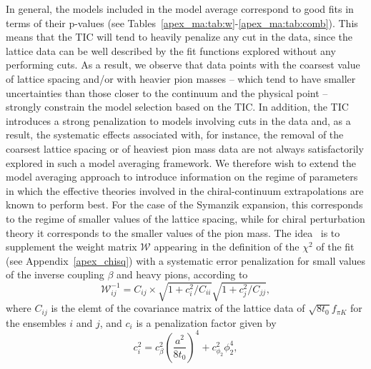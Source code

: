 In general, the models included in the model average correspond to good fits in terms of their p-values (see Tables~\ref{apex_ma:tab:w}-\ref{apex_ma:tab:comb}). This means that the TIC will tend to heavily penalize any cut in the data, since the lattice data can be well described by the fit functions explored without any performing cuts. As a result, we observe that data points with the coarsest value of lattice spacing and/or with heavier pion masses -- which tend to have smaller uncertainties than those closer to the continuum and the physical point -- strongly constrain the model selection based on the TIC. In addition, the TIC introduces a strong  penalization to models involving cuts in the data and, as a result, the systematic effects associated with, for instance, the removal of the coarsest lattice spacing or of heaviest pion mass data are not always satisfactorily explored in such a model averaging framework. We therefore wish to extend the model averaging approach to introduce information on the regime of parameters in which the effective theories involved in the chiral-continuum extrapolations are known to perform best. For the case of the Symanzik expansion, this corresponds to the regime of smaller values of the lattice spacing, while for chiral perturbation theory it corresponds to the smaller values of the pion mass. The idea~\citep{DallaBrida:2016kgh} is to supplement the weight matrix $\mathcal{W}$ appearing in the definition of the $\chi^2$ of the fit (see Appendix~\ref{apex_chisq}) with a systematic error penalization for small values of the inverse coupling $\beta$ and heavy pions, according to 
\begin{equation}
\label{ch_ss:eq:Wpenal}
\mathcal{W}_{ij}^{-1}=C_{ij}\times\sqrt{1+c_i^2/C_{ii}}\sqrt{1+c_j^2/C_{jj}},
\end{equation}
where $C_{ij}$ is the elemt of the covariance matrix of the lattice data of $\sqrt{8t_0}f_{\pi K}$ for the ensembles $i$ and $j$, and $c_i$ is a penalization factor given by
\begin{equation}
\label{ch_ss:eq:penal}
c_i^2=c_{\beta}^2\left(\frac{a^2}{8t_0}\right)^4+c_{\phi_2}^2\phi_2^4,
\end{equation}
